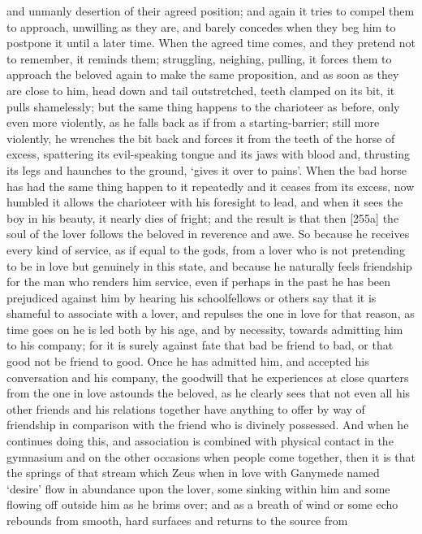 and unmanly desertion of their agreed position; and again  it
tries to compel them to approach, unwilling as they are, and barely
concedes when they beg him to postpone it until a later time. When the
agreed time comes, and they pretend not to  remember, it reminds
them; struggling, neighing, pulling, it forces them to approach the
beloved again to make the same proposition, and as soon as they are
close to him, head down and tail outstretched, teeth clamped on its bit,
it pulls shamelessly;  but the same thing happens to the
charioteer as before, only even more violently, as he falls back as if
from a starting-barrier; still more violently,
he wrenches the bit back and forces it from the teeth of the horse of
excess, spattering its evil-speaking tongue and its jaws with blood and,
thrusting its  legs and haunches to the ground, ‘gives it over
to pains'. When the bad
horse has had the same thing happen to it repeatedly and it ceases from
its excess, now humbled it allows the charioteer with his foresight to
lead, and when it sees the boy in his beauty, it nearly dies of fright;
and the result is that then {[}255a{]} the soul of the lover follows the
beloved in reverence and awe. So because he receives every kind of
service, as if equal to the gods, from a lover who is not pretending to
be in love but genuinely in this state, and because he naturally feels
friendship for the man who renders him service, even if perhaps in the
 past he has been prejudiced against him by hearing his
schoolfellows or others say that it is shameful to associate with a
lover, and repulses the one in love for that reason, as time goes on he
 is led both by his age, and by necessity, towards admitting him
to his company; for it is surely against fate that bad be friend to bad,
or that good not be friend to good. Once he has admitted him, and
accepted his conversation and his company, the goodwill that he
experiences at close quarters from the one in love  astounds the
beloved, as he clearly sees that not even all his other friends and his
relations together have anything to offer by way of friendship in
comparison with the friend who is divinely possessed. And when he
continues doing this, and association is combined with physical contact
in the gymnasium  and on the other occasions when people come
together, then it is that the springs of that stream which Zeus when in
love with Ganymede named
‘desire' flow in
abundance upon the lover, some sinking within him and some flowing off
outside him as he brims over; and as a breath of wind or some echo
rebounds from smooth, hard surfaces and returns to the source from
